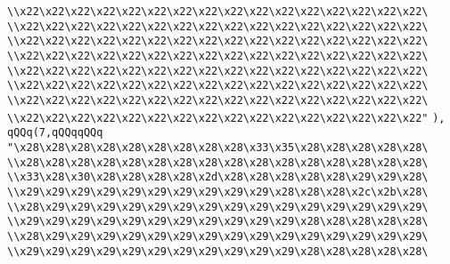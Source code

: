 \verb|\\x22\x22\x22\x22\x22\x22\x22\x22\x22\x22\x22\x22\x22\x22\x22\x22\|\newline
\verb|\\x22\x22\x22\x22\x22\x22\x22\x22\x22\x22\x22\x22\x22\x22\x22\x22\|\newline
\verb|\\x22\x22\x22\x22\x22\x22\x22\x22\x22\x22\x22\x22\x22\x22\x22\x22\|\newline
\verb|\\x22\x22\x22\x22\x22\x22\x22\x22\x22\x22\x22\x22\x22\x22\x22\x22\|\newline
\verb|\\x22\x22\x22\x22\x22\x22\x22\x22\x22\x22\x22\x22\x22\x22\x22\x22\|\newline
\verb|\\x22\x22\x22\x22\x22\x22\x22\x22\x22\x22\x22\x22\x22\x22\x22\x22\|\newline
\verb|\\x22\x22\x22\x22\x22\x22\x22\x22\x22\x22\x22\x22\x22\x22\x22\x22\|\newline
\verb|\\x22\x22\x22\x22\x22\x22\x22\x22\x22\x22\x22\x22\x22\x22\x22\x22"|\newline
\verb|),|\newline
\verb|qQQq(7,qQQqqQQq|\newline
\verb|"\x28\x28\x28\x28\x28\x28\x28\x28\x28\x33\x35\x28\x28\x28\x28\x28\|\newline
\verb|\\x28\x28\x28\x28\x28\x28\x28\x28\x28\x28\x28\x28\x28\x28\x28\x28\|\newline
\verb|\\x33\x28\x30\x28\x28\x28\x28\x2d\x28\x28\x28\x28\x28\x29\x29\x28\|\newline
\verb|\\x29\x29\x29\x29\x29\x29\x29\x29\x29\x29\x28\x28\x28\x2c\x2b\x28\|\newline
\verb|\\x28\x29\x29\x29\x29\x29\x29\x29\x29\x29\x29\x29\x29\x29\x29\x29\|\newline
\verb|\\x29\x29\x29\x29\x29\x29\x29\x29\x29\x29\x29\x28\x28\x28\x28\x28\|\newline
\verb|\\x28\x29\x29\x29\x29\x29\x29\x29\x29\x29\x29\x29\x29\x29\x29\x29\|\newline
\verb|\\x29\x29\x29\x29\x29\x29\x29\x29\x29\x29\x29\x28\x28\x28\x28\x28\|\newline

